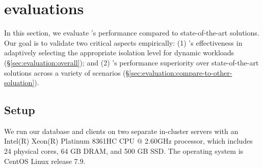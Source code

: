 \section{evaluations\label{sec:evaluation}}

In this section, we evaluate \sysname's performance compared to state-of-the-art solutions. 
Our goal is to validate two critical aspects empirically: (1) \sysname's effectiveness in adaptively selecting the appropriate isolation level for dynamic workloads (\S\ref{sec:evaluation:overall}); and (2) \sysname's performance superiority over state-of-the-art solutions across a variety of scenarios (\S\ref{sec:evaluation:compare-to-other-soluation}). 

\subsection{Setup}
We run our database and clients on two separate in-cluster servers with an Intel(R) Xeon(R) Platinum 8361HC CPU @ 2.60GHz processor, which includes 24 physical cores, 64 GB DRAM, and 500 GB SSD. 
The operating system is CentOS Linux release 7.9. 



